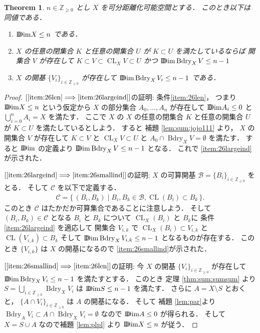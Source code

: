 \documentclass[leqno, a4paper, 12pt]{jsarticle}
\theoremstyle{plain}
\newtheorem{thm}{Theorem}[section]
\theoremstyle{definition}
\theoremstyle{remark}
\newcommand{\To}{\Longrightarrow}
\newcommand{\zz}{\mathbb{Z}}
\DeclareMathOperator{\bd}{\mathrm{Bdry}}
\DeclareMathOperator{\cl}{\mathrm{CL}}
\newcommand{\yoddim}{\mathrm{D\hspace{-5.5pt}Dim}}
\numberwithin{equation}{section}
\begin{document}
\begin{thm}\label{thm:boundary2222}
$n\in \zz_{\ge 0}$
とし
$X$
を可分距離化可能空間とする．
このとき以下は同値である．
\begin{enumerate}[label=\textup{(\arabic*)}]


\item\label{item:26len}
$\yoddim X\le n$
である．


\item\label{item:26largeind}
$X$
の任意の閉集合
$K$
と任意の開集合
$U$
が
$K\subset U$
を満たしているならば
開集合
$V$
が存在して
$K\subset V\subset \cl_{X}V\subset U$
かつ
$\yoddim\bd_{X}V\le n-1$


\item\label{item:26smallind}
$X$
の開基
$\{V_{i}\}_{i\in \zz_{\ge 0}}$
が存在して
$\yoddim\bd_{X} V_{i}\le n-1$
である．
\end{enumerate}
\end{thm}
\begin{proof}
$[\ref{item:26len}\To \ref{item:26largeind}]$の証明: 
条件\ref{item:26len}，
つまり
$\yoddim X\le n$
という仮定から
$X$
の部分集合
$A_{0}, \dots, A_{n}$
が存在して
$\yoddim A_{i}\le 0$
と
$\bigcup_{i=0}^{n}A_{i}=X$
を満たす．
ここで
$X$
の
$X$
の任意の閉集合
$K$
と任意の開集合
$U$
が
$K\subset U$
を満たしているとしよう．
すると
補題 
\ref{lem:sum:jojo111}
より，
$X$
の開集合
$V$
が存在して
$K\subset V$
と
$\cl_{X}V\subset U$
と
$A_{0}\cap \bd_{X}V=\emptyset$
を満たす．
すると
$\yoddim$
の定義より
$\yoddim\bd_{X}V\le n-1$
となる．
これで
 \ref{item:26largeind}が示された．

$[\ref{item:26largeind}\To \ref{item:26smallind}]$の証明: 
$X$
の可算開基
$\mathcal{B}=\{B_{i}\}_{i\in \zz_{\ge 0}}$
をとる．
そして
$\mathcal{C}$
を以下で定義する．
\begin{align}
\mathcal{C}=\{\, (B_{i}, B_{k})\mid B_{i}, B_{k}\in\mathcal{B},   \cl(B_{i})\subset B_{k}\, \}. 
\end{align}
このとき
$\mathcal{C}$
はたかだか可算集合であることに注意しよう．
そして
$(B_{i}, B_{k})\in \mathcal{C}$
となる
$B_{i}$
と
$B_{k}$
について
$\cl_{X}(B_{i})$
と
$B_{k}$に
条件\ref{item:26largeind}
を適応して
開集合
$V_{i, k}$
で
$\cl_{X}(B_{i})\subset V_{i, k}$
と
$\cl(V_{i, k})\subset B_{k}$
そして
$\yoddim\bd_{X}V_{i, k}\le n-1$
となるものが存在する．
このとき
$\{V_{i, k}\}$
は
$X$
の開基になるので
\ref{item:26smallind}が示された．

$[\ref{item:26smallind}\To \ref{item:26len}]$の証明: 
今
$X$
の開基
$\{V_{i}\}_{i\in \zz_{\ge 0}}$
が存在して
$\yoddim\bd_{X} V_{i}\le n-1$
を満たすとする．
このとき
定理 
\ref{thm:sum:sumsum}
より
$S=\bigcup_{i\in \zz_{\ge 0}}\bd_{X}V_{i}$
は
$\yoddim S\le n-1$
を満たす．
さらに
$A=X\setminus S$
とおくと，
$\{A\cap V_{i}\}_{i\in \zz_{\ge 0}}$
は
$A$
の開基になる．
そして
補題 
\ref{lem:par}より
$\bd_{A}V_{i}\subset A\cap \bd_{X}V_{i}=\emptyset$
なので
$\yoddim A\le 0$
が得られる．
そして
$X=S\cup A$
なので補題 \ref{lem:plpl}
より
$\yoddim X\le n$
が従う．
\end{proof}
\end{document}
